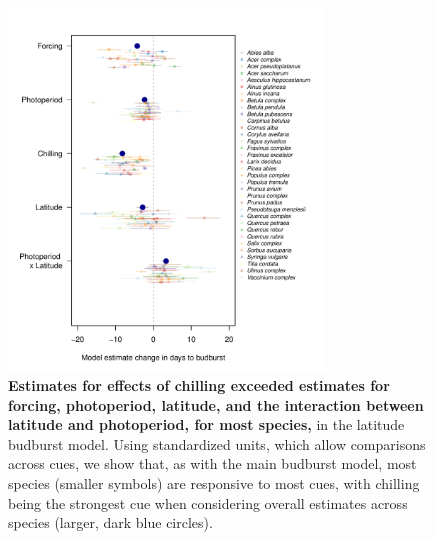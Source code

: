 \documentclass{article}
\begin{document}
\begin{figure}[h!]
\centering
\noindent \includegraphics[width=0.75\textwidth]{..//..//analyses/lat_analysis/figures/latanalysis_spcom_expramp_fp.pdf}
\caption{\textbf{Estimates for effects of chilling exceeded estimates for forcing, photoperiod, latitude, and the interaction between latitude and photoperiod, for most species,} in the latitude budburst model. Using standardized units, which allow comparisons across cues, we show that, as with the main budburst model, most species (smaller symbols) are responsive to most cues, with chilling being the strongest cue when considering overall estimates across species (larger, dark blue circles).}
\label{fig:lat}
\end{figure}
\end{document}
